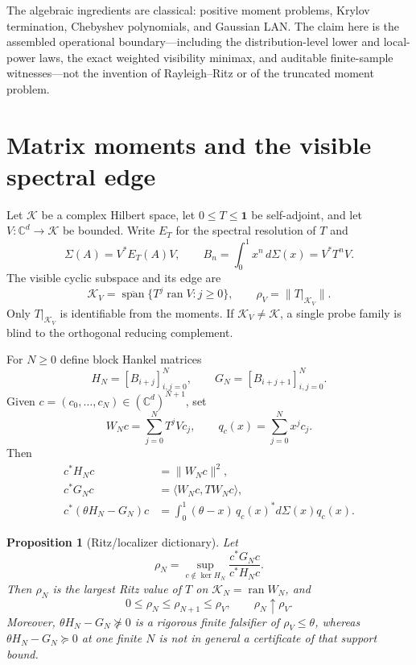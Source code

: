 \documentclass[11pt]{article}
\newtheorem{proposition}[theorem]{Proposition}
\theoremstyle{definition}
\theoremstyle{remark}
\newcommand{\C}{\mathbb C}
\newcommand{\K}{\mathcal K}
\newcommand{\ran}{\operatorname{ran}}
\newcommand{\Id}{\mathbf 1}
\begin{document}
The algebraic ingredients are classical: positive moment problems,
Krylov termination, Chebyshev polynomials, and Gaussian LAN.  The claim here is the
assembled operational boundary---including the distribution-level lower
and local-power laws, the exact weighted visibility minimax, and auditable
finite-sample witnesses---not
the invention of Rayleigh--Ritz or of the truncated moment problem.

\section{Matrix moments and the visible spectral edge}

Let $\K$ be a complex Hilbert space, let $0\leq T\leq\Id$ be self-adjoint, and
let $V:\C^d\to\K$ be bounded.  Write $E_T$ for the spectral resolution of $T$
and
\begin{equation}
  \Sigma(A)=V^*E_T(A)V,
  \qquad B_n=\int_0^1 x^n\,d\Sigma(x)=V^*T^nV.       \label{eq:matrixmeasure}
\end{equation}
The visible cyclic subspace and its edge are
\begin{equation}
 \K_V=\overline{\operatorname{span}}\{T^j\ran V:j\geq0\},
 \qquad \rho_V=\|T|_{\K_V}\|.                       \label{eq:visibleedge}
\end{equation}
Only $T|_{\K_V}$ is identifiable from the moments.  If $\K_V\neq\K$, a
single probe family is blind to the orthogonal reducing complement.

For $N\geq0$ define block Hankel matrices
\begin{equation}
 H_N=[B_{i+j}]_{i,j=0}^N,\qquad
 G_N=[B_{i+j+1}]_{i,j=0}^N.                          \label{eq:pencil}
\end{equation}
Given $c=(c_0,\ldots,c_N)\in(\C^d)^{N+1}$, set
\begin{equation}
 W_Nc=\sum_{j=0}^N T^jVc_j,
 \qquad q_c(x)=\sum_{j=0}^N x^jc_j.                  \label{eq:krylovmap}
\end{equation}
Then
\begin{align}
 c^*H_Nc&=\|W_Nc\|^2,\nonumber\\
 c^*G_Nc&=\langle W_Nc,TW_Nc\rangle,\nonumber\\
 c^*(\theta H_N-G_N)c
 &=\int_0^1(\theta-x)\,q_c(x)^*d\Sigma(x)q_c(x).     \label{eq:localizeridentity}
\end{align}

\begin{proposition}[Ritz/localizer dictionary]          \label{prop:ritz}
Let
\begin{equation}
 \rho_N=\sup_{c\notin\ker H_N}\frac{c^*G_Nc}{c^*H_Nc}.
\end{equation}
Then $\rho_N$ is the largest Ritz value of $T$ on
$\K_N=\ran W_N$, and
\begin{equation}
 0\leq\rho_N\leq\rho_{N+1}\leq\rho_V,
 \qquad \rho_N\uparrow\rho_V.                       \label{eq:ritzmonotone}
\end{equation}
Moreover, $\theta H_N-G_N\not\succeq0$ is a rigorous finite
falsifier of $\rho_V\leq\theta$, whereas
$\theta H_N-G_N\succeq0$ at one finite $N$ is not in general a certificate of
that support bound.
\end{proposition}
\end{document}
